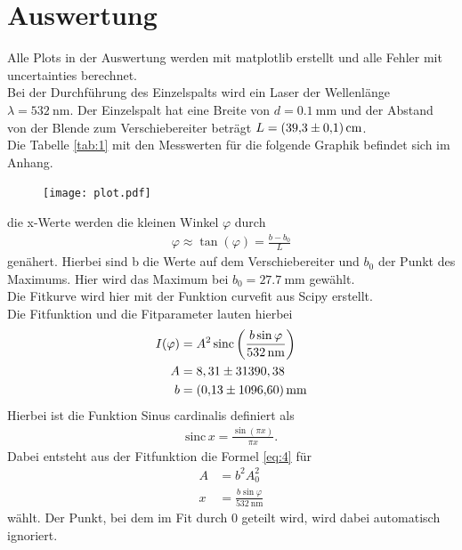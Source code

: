 \section{Auswertung}
Alle Plots in der Auswertung werden mit matplotlib \cite{matplotlib} erstellt und alle
Fehler mit uncertainties \cite{uncertainties} berechnet.\\
Bei der Durchführung des Einzelspalts wird ein Laser der Wellenlänge $\lambda = \SI{532}{\nano\meter} $.
Der Einzelspalt hat eine Breite von $d=\SI{0.1}{\milli\meter} $ und der Abstand von 
der Blende zum Verschiebereiter beträgt $L=\SI{39.3+-0.1}{\centi\meter} $.\\
Die Tabelle \ref{tab:1} mit den Messwerten für die folgende Graphik befindet sich im Anhang.
\begin{figure}[H]
    \centering
    \texttt{[image: plot.pdf]}
    \caption{} %
    \label{fig:4} 
\end{figure}
\justifying die x-Werte werden die kleinen Winkel $\varphi$ durch 
\begin{align}
    \varphi \approx \tan (\varphi) = \frac{b-b_0}{L} \label{eq:5}
\end{align}
genähert. Hierbei sind b die Werte auf dem Verschiebereiter und $b_0$ der Punkt des Maximums.
Hier wird das Maximum bei $b_0= \SI{27.7}{\milli\meter} $ gewählt.\\
Die Fitkurve wird hier mit der Funktion curvefit aus Scipy \cite{scipy} erstellt.\\
Die Fitfunktion und die Fitparameter lauten hierbei
\begin{subequations}
\begin{align}
    I(\varphi) &= A^2 \,\text{sinc} \left(\frac{b \sin{\varphi}}{\SI{532}{\nano\meter}} \right) \label{eq:6a}\\
    A &= 8,31 \pm 31390,38 \label{eq:6b}\\
    b &= \SI{0.13+-1096.6}{\milli\meter} \label{eq:6c}
\end{align}
\end{subequations}
Hierbei ist die Funktion Sinus cardinalis definiert als
\begin{align}
    \text{sinc}\,x = \frac{\sin (\pi x)}{\pi x} \label{eq:7} .
\end{align}
Dabei entsteht aus der Fitfunktion die Formel \eqref{eq:4} für
\begin{align}
    A &= b^2 A_0^2 \label{eq:8} \\
    x &= \frac{b \sin{\varphi}}{\SI{532}{\nano\meter}} \label{eq:9}
\end{align}
wählt.
Der Punkt, bei dem im Fit durch 0 geteilt wird, wird dabei automatisch ignoriert.



